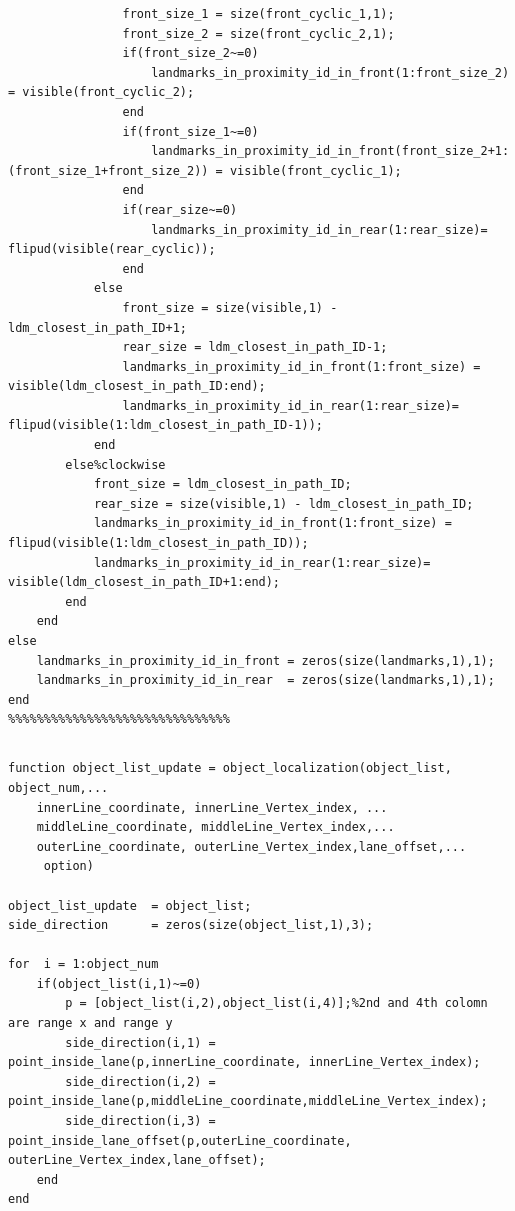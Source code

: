 \documentclass[12pt,a4paper]{article}
\newcommand{\zhiv}{\fontsize{12pt}{18pt}\selectfont}      %
\begin{document}
{{{\begin{verbatim}
                front_size_1 = size(front_cyclic_1,1);
                front_size_2 = size(front_cyclic_2,1);
                if(front_size_2~=0)
                    landmarks_in_proximity_id_in_front(1:front_size_2) = visible(front_cyclic_2);
                end
                if(front_size_1~=0)
                    landmarks_in_proximity_id_in_front(front_size_2+1:(front_size_1+front_size_2)) = visible(front_cyclic_1);
                end
                if(rear_size~=0)
                    landmarks_in_proximity_id_in_rear(1:rear_size)= flipud(visible(rear_cyclic));           
                end    
            else
                front_size = size(visible,1) - ldm_closest_in_path_ID+1;
                rear_size = ldm_closest_in_path_ID-1;
                landmarks_in_proximity_id_in_front(1:front_size) = visible(ldm_closest_in_path_ID:end);
                landmarks_in_proximity_id_in_rear(1:rear_size)= flipud(visible(1:ldm_closest_in_path_ID-1));
            end
        else%clockwise
            front_size = ldm_closest_in_path_ID;
            rear_size = size(visible,1) - ldm_closest_in_path_ID;
            landmarks_in_proximity_id_in_front(1:front_size) = flipud(visible(1:ldm_closest_in_path_ID));
            landmarks_in_proximity_id_in_rear(1:rear_size)= visible(ldm_closest_in_path_ID+1:end);
        end
    end
else
    landmarks_in_proximity_id_in_front = zeros(size(landmarks,1),1);
    landmarks_in_proximity_id_in_rear  = zeros(size(landmarks,1),1); 
end
%%%%%%%%%%%%%%%%%%%%%%%%%%%%%%%
\end{verbatim}
{\subsection{\textbf{\song\zhiv{目标定位模块 m函数}}}}

\begin{verbatim}
function object_list_update = object_localization(object_list, object_num,...
    innerLine_coordinate, innerLine_Vertex_index, ...
    middleLine_coordinate, middleLine_Vertex_index,...
    outerLine_coordinate, outerLine_Vertex_index,lane_offset,...
     option)

object_list_update  = object_list;
side_direction      = zeros(size(object_list,1),3);

for  i = 1:object_num
    if(object_list(i,1)~=0)
        p = [object_list(i,2),object_list(i,4)];%2nd and 4th colomn are range x and range y
        side_direction(i,1) = point_inside_lane(p,innerLine_coordinate, innerLine_Vertex_index);
        side_direction(i,2) = point_inside_lane(p,middleLine_coordinate,middleLine_Vertex_index);
        side_direction(i,3) = point_inside_lane_offset(p,outerLine_coordinate, outerLine_Vertex_index,lane_offset);       
    end
end


\end{verbatim}}}}
\end{document}
